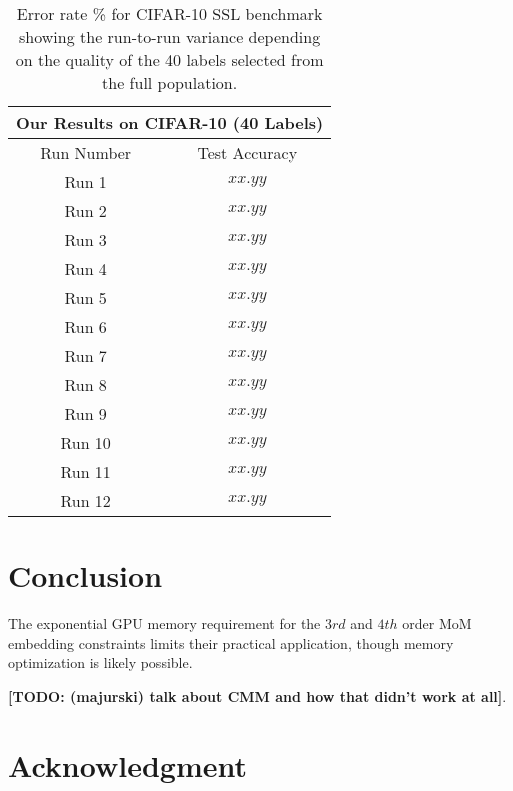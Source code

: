 \documentclass[10pt,twocolumn,letterpaper]{article}
\newcommand{\TODO}[1]{\textbf{\color{red}[TODO: #1]}}
\begin{document}
\begin{table}[htbp]
	\begin{tabular}{c|c}
		\multicolumn{2}{c}{Our Results on CIFAR-10 (40 Labels)}\\
		\hline
		Run Number            & Test Accuracy \\ 
		
		\hline
		Run 1   & $xx.yy$     \\ 
		Run 2      & $xx.yy$    \\
		Run 3   & $xx.yy$ \\
		Run 4    & $xx.yy$ \\
		Run 5    & $xx.yy$ \\ 
		Run 6    & $xx.yy$ \\ 
		Run 7    & $xx.yy$ \\ 
		Run 8    & $xx.yy$ \\ 
		Run 9    & $xx.yy$  \\ 
		Run 10    & $xx.yy$ \\ 
		Run 11   & $xx.yy$ \\ 
		Run 12    & $xx.yy$ \\ 
		
	\end{tabular}
	\caption{Error rate \% for CIFAR-10 SSL benchmark showing the run-to-run variance depending on the quality of the 40 labels selected from the full population.}
	\label{table4}
\end{table}




\section{Conclusion}

The exponential GPU memory requirement for the $3rd$ and $4th$ order MoM embedding constraints limits their practical application, though memory optimization is likely possible.


\TODO{(majurski) talk about CMM and how that didn't work at all}.


\section{Acknowledgment}


{
	\small
	
	
}
\end{document}
